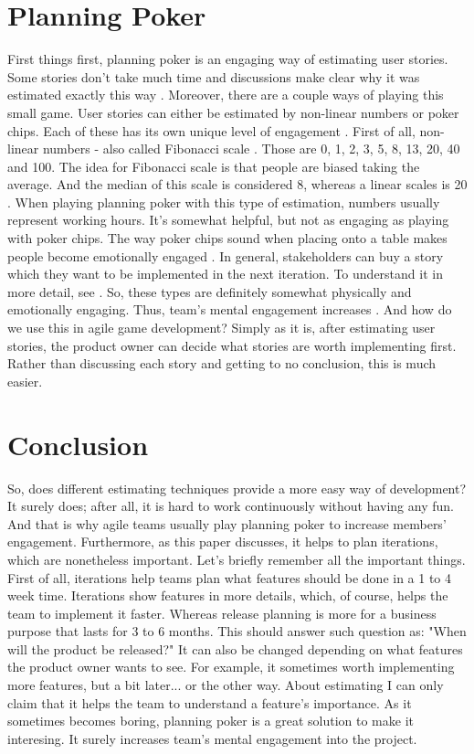\documentclass{scrartcl}
\begin{document}
\begin{multicols}{2}
\section{Planning Poker}
First things first, planning poker is an engaging way of estimating user stories.
Some stories don't take much time \cite{grenning2002planning} and discussions make clear why it was estimated exactly this way \cite{cohn2005agile}.
Moreover, there are a couple ways of playing this small game.
User stories can either be estimated by non-linear numbers or poker chips.
Each of these has its own unique level of engagement \cite{molokken2007combining}.
First of all, non-linear numbers - also called Fibonacci scale \cite{tamrakar2012does}.
Those are 0, 1, 2, 3, 5, 8, 13, 20, 40 and 100.
The idea for Fibonacci scale is that people are biased taking the average.
And the median of this scale is considered 8, whereas a linear scales is 20 \cite{tamrakar2012does}.
When playing planning poker with this type of estimation, numbers usually represent working hours.
It's somewhat helpful, but not as engaging as playing with poker chips.
The way poker chips sound when placing onto a table makes people become emotionally engaged \cite{yip2007hands}.
In general, stakeholders can buy a story which they want to be implemented in the next iteration.
To understand it in more detail, see \cite{yip2007hands}.
So, these types are definitely somewhat physically and emotionally engaging.
Thus, team's mental engagement increases \cite{yip2007hands}.
And how do we use this in agile game development? 
Simply as it is, after estimating user stories, the product owner can decide what stories are worth implementing first.
Rather than discussing each story and getting to no conclusion, this is much easier.

\section{Conclusion}
So, does different estimating techniques provide a more easy way of development?
It surely does; after all, it is hard to work continuously without having any fun.
And that is why agile teams usually play planning poker to increase members' engagement.
Furthermore, as this paper discusses, it helps to plan iterations, which are nonetheless important.
Let's briefly remember all the important things.
First of all, iterations help teams plan what features should be done in a 1 to 4 week time.
Iterations show features in more details, which, of course, helps the team to implement it faster.
Whereas release planning is more for a business purpose that lasts for 3 to 6 months.
This should answer such question as: "When will the product be released?"
It can also be changed depending on what features the product owner wants to see.
For example, it sometimes worth implementing more features, but a bit later... or the other way.
About estimating I can only claim that it helps the team to understand a feature's importance.
As it sometimes becomes boring, planning poker is a great solution to make it interesing.
It surely increases team's mental engagement into the project.

\end{multicols}



\end{document}
